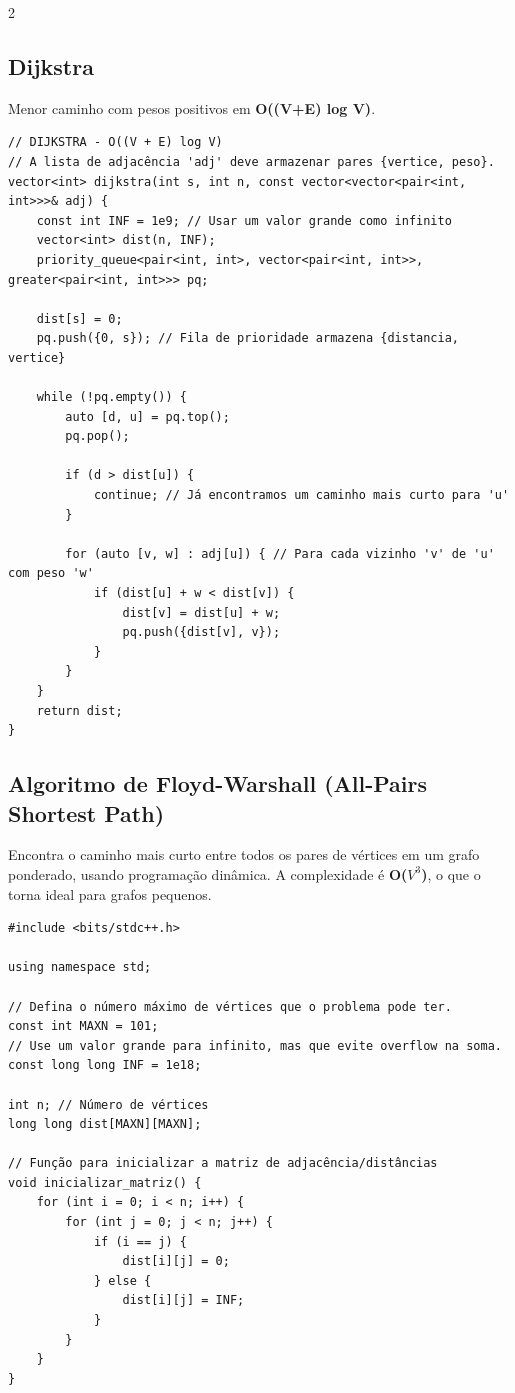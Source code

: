 \documentclass[11pt]{article}
\begin{document}
\begin{multicols}{2}
\subsection{Dijkstra}
Menor caminho com pesos positivos em \textbf{O((V+E) log V)}.
\begin{lstlisting}
// DIJKSTRA - O((V + E) log V)
// A lista de adjacência 'adj' deve armazenar pares {vertice, peso}.
vector<int> dijkstra(int s, int n, const vector<vector<pair<int, int>>>& adj) {
    const int INF = 1e9; // Usar um valor grande como infinito
    vector<int> dist(n, INF);
    priority_queue<pair<int, int>, vector<pair<int, int>>, greater<pair<int, int>>> pq;

    dist[s] = 0;
    pq.push({0, s}); // Fila de prioridade armazena {distancia, vertice}

    while (!pq.empty()) {
        auto [d, u] = pq.top();
        pq.pop();

        if (d > dist[u]) {
            continue; // Já encontramos um caminho mais curto para 'u'
        }

        for (auto [v, w] : adj[u]) { // Para cada vizinho 'v' de 'u' com peso 'w'
            if (dist[u] + w < dist[v]) {
                dist[v] = dist[u] + w;
                pq.push({dist[v], v});
            }
        }
    }
    return dist;
}
\end{lstlisting}

\subsection{Algoritmo de Floyd-Warshall (All-Pairs Shortest Path)}
Encontra o caminho mais curto entre todos os pares de vértices em um grafo ponderado, usando programação dinâmica. A complexidade é \textbf{O($V^3$)}, o que o torna ideal para grafos pequenos.
\begin{lstlisting}
#include <bits/stdc++.h>

using namespace std;

// Defina o número máximo de vértices que o problema pode ter.
const int MAXN = 101; 
// Use um valor grande para infinito, mas que evite overflow na soma.
const long long INF = 1e18; 

int n; // Número de vértices
long long dist[MAXN][MAXN];

// Função para inicializar a matriz de adjacência/distâncias
void inicializar_matriz() {
    for (int i = 0; i < n; i++) {
        for (int j = 0; j < n; j++) {
            if (i == j) {
                dist[i][j] = 0;
            } else {
                dist[i][j] = INF;
            }
        }
    }
}


\end{lstlisting}
\end{multicols}
\end{document}

